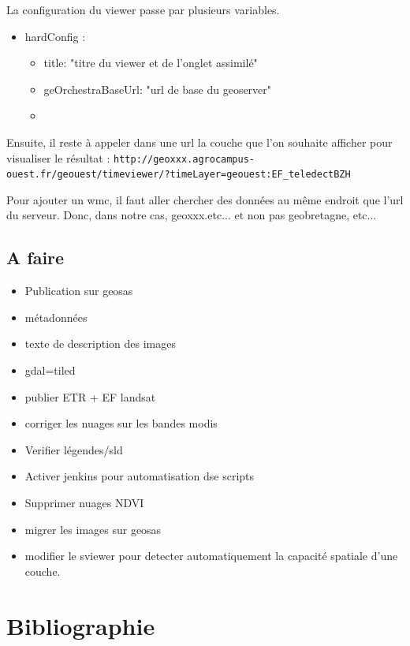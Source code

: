 \documentclass[10pt,a4paper]{article}
\begin{document}
La configuration du viewer passe par plusieurs variables.
\begin{itemize}
\item hardConfig :
\begin{itemize}
\item title: "titre du viewer et de l'onglet assimilé"
\item geOrchestraBaseUrl: "url de base du geoserver"
\item 
\end{itemize}
\end{itemize}

Ensuite, il reste à appeler dans une url la couche que l'on souhaite afficher pour visualiser le résultat : \verb!http://geoxxx.agrocampus-ouest.fr/geouest/timeviewer/?timeLayer=geouest:EF_teledectBZH!

Pour ajouter un wmc, il faut aller chercher des données au même endroit que l'url du serveur. Donc, dans notre cas, geoxxx.etc... et non pas geobretagne, etc...
\subsection{A faire}
\begin{itemize}
\item Publication sur geosas
\item métadonnées
\item texte de description des images
\item gdal=tiled
\item publier ETR + EF landsat
\item corriger les nuages sur les bandes modis
\item Verifier légendes/sld
\item Activer jenkins pour automatisation dse scripts
\item Supprimer nuages NDVI
\item migrer les images sur geosas
\item modifier le sviewer pour detecter automatiquement la capacité spatiale d'une couche.
\end{itemize}
\section{Bibliographie}
\end{document}
